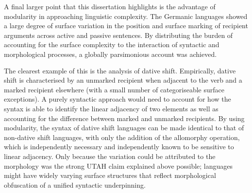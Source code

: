 A final larger point that this dissertation highlights is the advantage of modularity in approaching linguistic complexity. The Germanic languages showed a large degree of surface variation in the position and surface marking of recipient arguments across active and passive sentences. By distributing the burden of accounting for the surface complexity to the interaction of syntactic and morphological processes, a globally parsimonious account was achieved.

The clearest example of this is the analysis of dative shift. Empirically, dative shift is characterised by an unmarked recipient when adjacent to the verb and a marked recipient elsewhere (with a small number of categoriseable surface exceptions). A purely syntactic approach would need to account for how the syntax is able to identify the linear adjacency of two elements as well as accounting for the difference between marked and unmarked recipients. By using modularity, the syntax of dative shift languages can be made identical to that of non-dative shift languages, with only the addition of the allomorphy operation, which is independently necessary and independently known to be sensitive to linear adjacency. Only because the variation could be attributed to the morphology was the strong UTAH claim explained above possible; languages might have widely varying surface structures that reflect morphological obfuscation of a unified syntactic underpinning.

%
